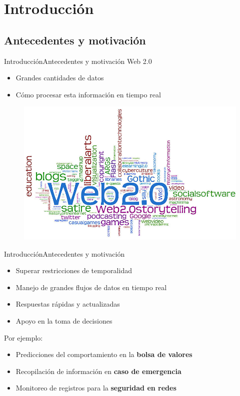 \section{Introducción}
\subsection*{Antecedentes y motivación}

\begin{frame}{Introducción}{Antecedentes y motivación}
Web 2.0
\begin{itemize}
\item Grandes cantidades de datos
\item Cómo procesar esta información en tiempo real
\end{itemize}

\begin{figure}
  \center
    \includegraphics[scale=0.35]{images/Web.jpg}
\end{figure}
\end{frame}

\begin{frame}{Introducción}{Antecedentes y motivación}
\begin{itemize}
\item Superar restricciones de temporalidad
\item Manejo de grandes flujos de datos en tiempo real
\item Respuestas rápidas y actualizadas
\item Apoyo en la toma de decisiones
\end{itemize}
Por ejemplo:
\begin{itemize}
	\item Predicciones del comportamiento en la \textbf{bolsa de valores}
	\item Recopilación de información en \textbf{caso de emergencia}
	\item Monitoreo de registros para la \textbf{seguridad en redes}
\end{itemize}
\end{frame}

